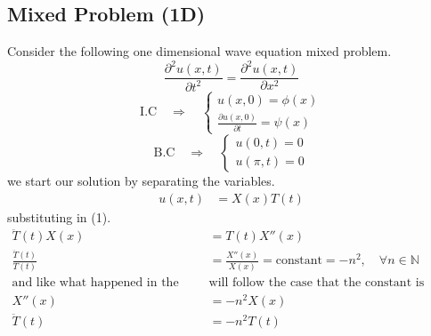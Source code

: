 \documentclass[]{article}
\begin{document}
\subsection{Mixed Problem (1D)}
Consider the following one dimensional wave equation mixed problem.
\begin{equation}
\frac{\partial^2 u\left(x,t\right)}{\partial t^2}=\frac{\partial^2 u\left(x,t\right)}{\partial x^2}
\end{equation}
\begin{equation}
    \text{I.C} \quad \Longrightarrow \quad 
    \begin{cases}
    u\left(x,0 \right) = \phi\left(x\right)
    \\
    \frac{\partial u\left(x,0 \right)}{\partial t} = \psi\left(x\right)
    \end{cases}
\end{equation}
\begin{equation}
    \text{B.C} \quad \Longrightarrow \quad 
    \begin{cases}
    u\left(0,t \right) = 0
    \\
    u\left(\pi,t\right)=0
    \end{cases}
\end{equation}
we start our solution by separating the variables.
\begin{align}
u\left(x,t\right) &= X\left(x\right)T\left(t\right)
\end{align}
substituting in (1).
\begin{align*}
\ddot{T}\left(t\right)X\left(x\right)&=T\left(t\right)X''\left(x\right)
\\
\frac{\ddot{T}\left(t\right)}{T\left(t\right)} &= \frac{X''\left(x\right)}{X\left(x\right)}= \text{constant} = - n^2,\quad \forall n \in \mathbb{N}
\\
\text{and like what happened in the heat equation we }&\text{will follow the case that the constant is negative}
\\
X''\left(x\right)&=-n^2 X\left(x\right)
\\
\ddot{T}\left(t\right) &= -n^2 T\left(t\right)
\end{align*}
\end{document}
